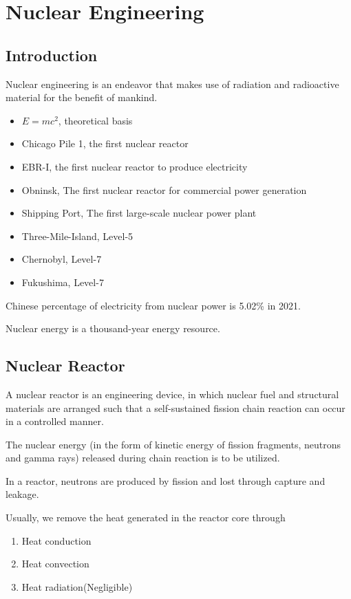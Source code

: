 \section{Nuclear Engineering}

\subsection{Introduction}

Nuclear engineering is an endeavor that makes use of radiation and radioactive material for the benefit of mankind. 

\begin{itemize}
    \item $E=mc^2$, theoretical basis
    \item Chicago Pile 1, the first nuclear reactor
    \item EBR-I, the first nuclear reactor to produce electricity
    \item Obninsk, The first nuclear reactor for commercial power generation
    \item Shipping Port, The first large-scale nuclear power plant
    \item Three-Mile-Island, Level-5
    \item Chernobyl, Level-7
    \item Fukushima, Level-7
\end{itemize}

Chinese percentage of electricity from nuclear power is 5.02\% in 2021.

Nuclear energy is a thousand-year energy resource.

\subsection{Nuclear Reactor}

A nuclear reactor is an engineering device, in which nuclear fuel and structural materials are arranged such that a self-sustained fission chain reaction can occur in a controlled manner.

The nuclear energy (in the form of kinetic energy of fission fragments, neutrons and gamma rays) released during chain reaction is to be utilized.

In a reactor, neutrons are produced by fission and lost through capture and leakage.

Usually, we remove the heat generated in the reactor core through
\begin{enumerate}
    \item Heat conduction
    \item Heat convection
    \item Heat radiation(Negligible)
\end{enumerate}
